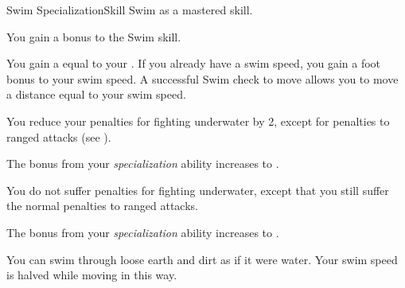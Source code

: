     \begin{feat}{Swim Specialization}{Skill}
        \featpre Swim as a mastered skill.

         You gain a  bonus to the Swim skill.

         You gain a  equal to your .
        If you already have a swim speed, you gain a  foot bonus to your swim speed.
        A successful Swim check to move allows you to move a distance equal to your swim speed.

         You reduce your penalties for fighting underwater by 2, except for penalties to  ranged attacks (see ).

         The bonus from your \textit{specialization} ability increases to .

         You do not suffer penalties for fighting underwater, except that you still suffer the normal penalties to  ranged attacks.

         The bonus from your \textit{specialization} ability increases to .

         You can swim through loose earth and dirt as if it were water.
        Your swim speed is halved while moving in this way.
    \end{feat}

